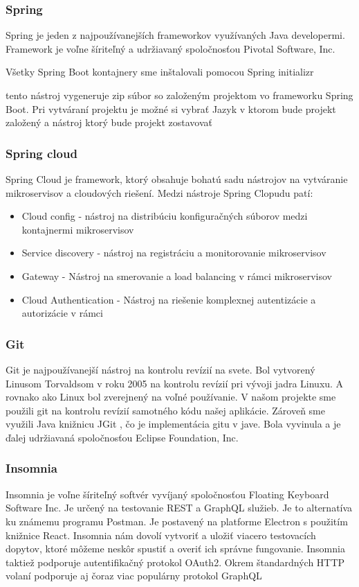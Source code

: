 \subsubsection{Spring}
Spring je jeden z najpoužívanejších frameworkov využívaných Java developermi. Framework je voľne šíriteľný a udržiavaný spoločnosťou Pivotal Software, Inc.

Všetky Spring Boot kontajnery sme inštalovali pomocou Spring initializr \cite{initializr}

tento nástroj vygeneruje zip súbor so založeným projektom vo frameworku Spring Boot. Pri vytváraní projektu je možné si vybrať Jazyk v ktorom bude projekt založený a nástroj ktorý bude projekt zostavovať %

\subsubsection{Spring cloud}

Spring Cloud je framework, ktorý obsahuje bohatú sadu nástrojov na vytváranie mikroservisov a cloudových riešení. Medzi nástroje Spring Clopudu patí:

\begin{itemize}
	\item Cloud config - nástroj na distribúciu konfiguračných súborov medzi kontajnermi mikroservisov
	\item Service discovery - nástroj na registráciu a monitorovanie mikroservisov
    \item Gateway - Nástroj na smerovanie a load balancing v rámci mikroservisov
	\item Cloud Authentication - Nástroj na riešenie komplexnej autentizácie a autorizácie v rámci

\end{itemize}

\subsubsection{Git}
Git je najpoužívanejší nástroj na kontrolu revízií na svete. Bol vytvorený Linusom Torvaldsom v roku 2005 na kontrolu revízií pri vývoji jadra Linuxu. A rovnako ako Linux bol zverejnený na voľné používanie. V našom projekte sme použili git na kontrolu revízií samotného kódu našej aplikácie. Zároveň sme využili Java knižnicu JGit \cite{jgit}, čo je implementácia gitu v jave. Bola vyvinula a je ďalej udržiavaná spoločnosťou Eclipse Foundation, Inc.

\subsubsection{Insomnia}
Insomnia \cite{insomnia} je voľne šíriteľný softvér vyvíjaný spoločnosťou Floating Keyboard Software Inc. Je určený na testovanie REST a GraphQL služieb. Je to alternatíva ku známemu programu Postman. Je postavený na platforme Electron s použitím knižnice React. Insomnia nám dovolí vytvoriť a uložiť viacero testovacích dopytov, ktoré môžeme neskôr spustiť a overiť ich správne fungovanie. Insomnia taktiež podporuje autentifikačný protokol OAuth2. Okrem štandardných HTTP volaní podporuje aj čoraz viac populárny protokol GraphQL

